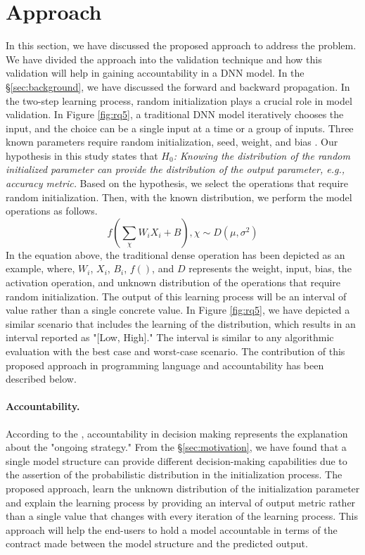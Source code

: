 \section{Approach}
\label{sec:approach}
In this section, we have discussed the proposed approach to address the problem. We have divided the approach into the validation technique and how this validation will help in gaining accountability in a DNN model. In the \S\ref{sec:background}, we have discussed the forward and backward propagation. In the two-step learning process, random initialization plays a crucial role in model validation. In Figure \ref{fig:rq5}, a traditional DNN model iteratively chooses the input, and the choice can be a single input at a time or a group of inputs. Three known parameters require random initialization, seed, weight, and bias \cite{sutskever2013importance}. Our hypothesis in this study states that \emph{$H_0$: Knowing the distribution of the random initialized parameter can provide the distribution of the output parameter, e.g., accuracy metric.} Based on the hypothesis, we select the operations that require random initialization. Then, with the known distribution, we perform the model operations as follows.
\begin{equation}
f(\sum_{\chi}{W_iX_i+B}), \chi\sim D(\mu, \sigma^2)
\end{equation}
In the equation above, the traditional dense operation has been depicted as an example, where, $W_i$, $X_i$, $B_i$, $f()$, and $D$ represents the weight, input, bias, the activation operation, and unknown distribution of the operations that require random initialization. The output of this learning process will be an interval of value rather than a single concrete value. In Figure \ref{fig:rq5}, we have depicted a similar scenario that includes the learning of the distribution, which results in an interval reported as "[Low, High]." The interval is similar to any algorithmic evaluation with the best case and worst-case scenario. 
The contribution of this proposed approach in programming language and accountability has been described below.
\paragraph{Accountability.} According to the \cite{veale2018fairness}, accountability in decision making represents the explanation about the "ongoing strategy." From the \S\ref{sec:motivation}, we have found that a single model structure can provide different decision-making capabilities due to the assertion of the probabilistic distribution in the initialization process. The proposed approach, learn the unknown distribution of the initialization parameter and explain the learning process by providing an interval of output metric rather than a single value that changes with every iteration of the learning process. This approach will help the end-users to hold a model accountable in terms of the contract made between the model structure and the predicted output.
